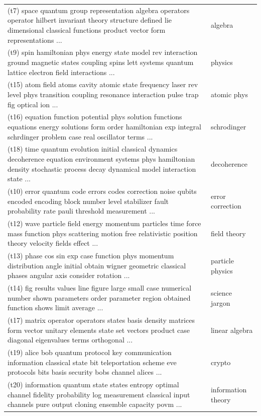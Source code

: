 \documentclass[11pt]{article}
\begin{document}
\begin{table}[t]
\begin{footnotesize}
\begin{raggedright}
\begin{tabular}{|p{4.7in} p{1.2in} |}
        (t7) space quantum group representation algebra operators operator hilbert invariant theory
        structure defined lie dimensional classical functions product vector form representations ...
        & algebra \\

        (t9) spin hamiltonian phys energy state model rev interaction ground magnetic states coupling spins
        lett systems quantum lattice electron field interactions ...
        & physics \\
        (t15) atom field atoms cavity atomic state frequency laser rev level phys transition coupling
        resonance interaction pulse trap fig optical ion ...
        & atomic phys \\
        (t16) equation function potential phys solution functions equations energy solutions form order
        hamiltonian exp integral schrdinger problem case real oscillator terms ...
        & schrodinger \\
        (t18) time quantum evolution initial classical dynamics decoherence equation environment systems
        phys hamiltonian density stochastic process decay dynamical model interaction state ...
        & decoherence \\
        (t10) error quantum code errors codes correction noise qubits encoded encoding block number level
        stabilizer fault probability rate pauli threshold measurement ...
        & error correction \\

        (t12) wave particle field energy momentum particles time force mass function phys scattering motion
        free relativistic position theory velocity fields effect ...
        & field theory \\
        (t13) phase cos sin exp case function phys momentum distribution angle initial obtain wigner
        geometric classical phases angular axis consider rotation ...
        & particle physics \\

        (t14) fig results values line figure large small case numerical number shown parameters order
        parameter region obtained function shows limit average ...
        & science jargon \\


        (t17) matrix operator operators states basis density matrices form vector unitary elements state set
        vectors product case diagonal eigenvalues terms orthogonal ...
        & linear algebra \\
        (t19) alice bob quantum protocol key communication information classical state bit teleportation
        scheme eve protocols bits basis security bobs channel alices ...
        & crypto \\
        (t20) information quantum state states entropy optimal channel fidelity probability log measurement
        classical input channels pure output cloning ensemble capacity povm ...
        & information theory \\


\end{tabular}
\end{raggedright}
\end{footnotesize}
\end{table}
\end{document}
